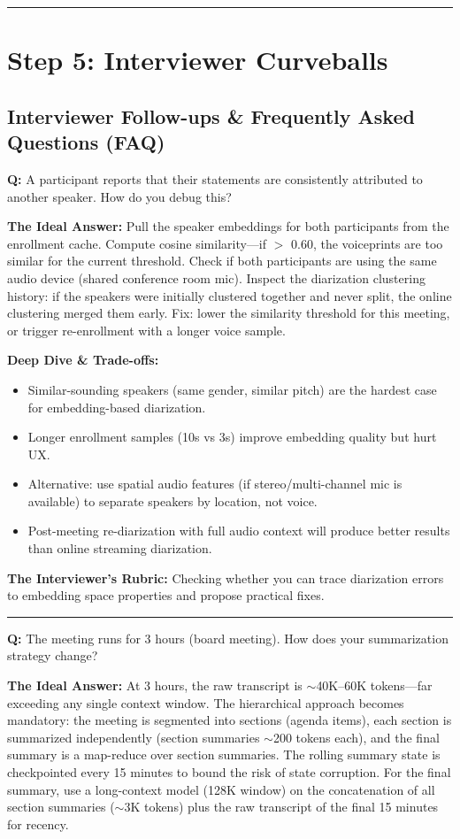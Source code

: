 \bigskip\hrule\bigskip

\section*{Step 5: Interviewer Curveballs}

\subsection*{Interviewer Follow-ups \& Frequently Asked Questions (FAQ)}

\textbf{Q:} A participant reports that their statements are consistently attributed to another speaker. How do you debug this?

\textbf{The Ideal Answer:} Pull the speaker embeddings for both participants from the enrollment cache. Compute cosine similarity---if $>$ 0.60, the voiceprints are too similar for the current threshold. Check if both participants are using the same audio device (shared conference room mic). Inspect the diarization clustering history: if the speakers were initially clustered together and never split, the online clustering merged them early. Fix: lower the similarity threshold for this meeting, or trigger re-enrollment with a longer voice sample.

\textbf{Deep Dive \& Trade-offs:}
\begin{itemize}
  \item Similar-sounding speakers (same gender, similar pitch) are the hardest case for embedding-based diarization.
  \item Longer enrollment samples (10s vs 3s) improve embedding quality but hurt UX.
  \item Alternative: use spatial audio features (if stereo/multi-channel mic is available) to separate speakers by location, not voice.
  \item Post-meeting re-diarization with full audio context will produce better results than online streaming diarization.
\end{itemize}

\textbf{The Interviewer's Rubric:} Checking whether you can trace diarization errors to embedding space properties and propose practical fixes.

\bigskip\hrule\bigskip

\textbf{Q:} The meeting runs for 3 hours (board meeting). How does your summarization strategy change?

\textbf{The Ideal Answer:} At 3 hours, the raw transcript is $\sim$40K--60K tokens---far exceeding any single context window. The hierarchical approach becomes mandatory: the meeting is segmented into sections (agenda items), each section is summarized independently (section summaries $\sim$200 tokens each), and the final summary is a map-reduce over section summaries. The rolling summary state is checkpointed every 15 minutes to bound the risk of state corruption. For the final summary, use a long-context model (128K window) on the concatenation of all section summaries ($\sim$3K tokens) plus the raw transcript of the final 15 minutes for recency.

